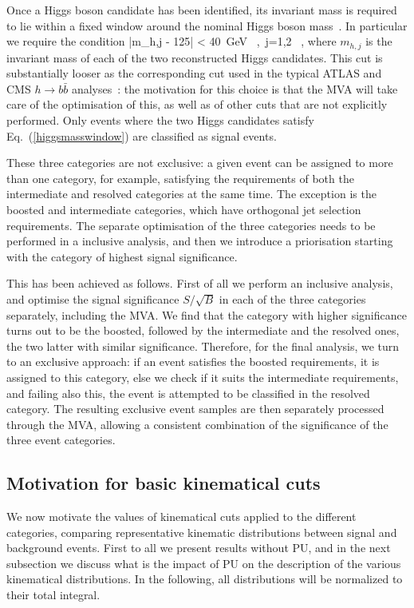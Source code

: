 Once a Higgs boson candidate has been identified,
its invariant mass is required to lie within a fixed window
around the nominal Higgs boson mass~\cite{Aad:2015zhl}.
%
In particular we require the condition
\be
\label{higgsmasswindow}
|m_{h,j} - 125| < 40~{\rm GeV} \, ,\, j=1,2 \, ,
\ee
where $m_{h,j}$ is the invariant mass of each of the two reconstructed  Higgs candidates.
%
This cut is substantially looser as the corresponding
cut used in the typical ATLAS and CMS $h\to b\bar{b}$
analyses~\cite{Aad:2012gxa,Chatrchyan:2013zna}: the motivation
for this choice is that the MVA will take care of the optimisation of this,
as well as of other cuts that are not explicitly performed.
%
Only events where the two Higgs candidates satisfy
Eq.~(\ref{higgsmasswindow}) are classified as signal events.
%

These three categories are not exclusive:
a given event can be assigned to more than one category, for
example, satisfying the requirements of both the intermediate
and resolved
categories at the same time.
%
The exception is the boosted and intermediate categories, which have
orthogonal jet selection requirements.
%
The separate optimisation of the three categories needs to be performed in
a inclusive analysis, and then we introduce a
 priorisation starting with the category of highest signal significance.


 This has been achieved as follows.
First of all we perform an inclusive analysis, and optimise the
signal significance
$S/\sqrt{B}$ in each of the three categories separately, including
the MVA.
%
We find that the category with higher significance turns out to be the boosted,
followed by the intermediate and the resolved ones, the two latter
with similar significance.
%
Therefore, for the final analysis, we turn to an exclusive approach:
if an event satisfies the boosted requirements, it is assigned to
this category, else we check if it suits the intermediate
requirements, and failing also this, the event is attempted to
be classified in the
resolved category.
%
The resulting exclusive event samples are then separately processed
through the MVA, allowing a consistent combination
of the significance of the three event categories.

\subsection{Motivation for basic kinematical cuts}

We now motivate the values of
kinematical cuts applied to the different categories, 
comparing representative kinematic distributions between
signal and background events.
%
First to all we present results without PU, and in the next
subsection we discuss what is the impact of PU
on the description of the various kinematical
distributions.
%
In the following, all
distributions will be normalized to their total integral.

